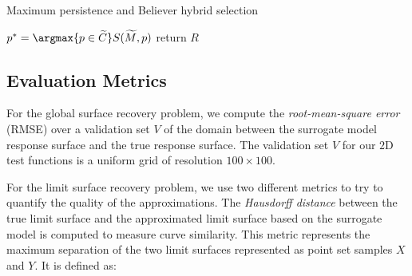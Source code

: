 {\fontsize{10}{10}\selectfont
\begin{algorithm}
\scriptsize
\caption{Maximum persistence and Believer hybrid selection}
\label{algo:maxp-believe}
\begin{algorithmic}
    \State $p^* = \argmax{p \in \widetilde{C}} S(\widetilde{M}, p)$
  \EndWhile
\EndWhile
\State return $R$
\EndProcedure
\end{algorithmic}
\end{algorithm}
}

\subsection{Evaluation Metrics}
\label{sec:evaluation_metrics}
%
For the global surface recovery problem, we compute the \emph{root-mean-square error} (RMSE) over a validation set $V$ of the domain between the surrogate model response surface and the true response surface.
%
The validation set $V$ for our $2$D test functions is a uniform grid of resolution $100\times100$.

For the limit surface recovery problem, we use two different metrics to try to quantify the quality of the approximations.
%
The \emph{Hausdorff distance} between the true limit surface and the approximated limit surface based on the surrogate model is computed to measure curve similarity.
%
This metric represents the maximum separation of the two limit surfaces represented as point set samples $X$ and $Y$. It is defined as:

